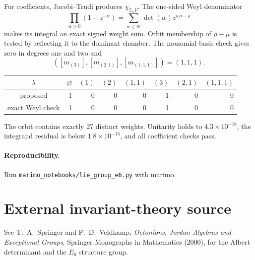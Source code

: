 \documentclass[10pt]{article}
\begin{document}
For coefficients, Jacobi--Trudi produces $\chi_{\mathbb S_\lambda V}$.
The one-sided Weyl denominator
\[
 \prod_{\alpha>0}(1-z^{-\alpha})=
 \sum_{w\in W}\det(w)z^{w\rho-\rho}
\]
makes its integral an exact signed weight sum.  Orbit membership of
$\rho-\mu$ is tested by reflecting it to the dominant chamber.
The monomial-basis check gives zero in degrees one and two and
\[
([m_{(3)}],[m_{(2,1)}],[m_{(1,1,1)}])=(1,1,1).
\]

\begin{center}\small
\begin{tabular}{@{}c|rrrrrrr@{}}\toprule
$\lambda$&$\varnothing$&$(1)$&$(2)$&$(1,1)$&$(3)$&$(2,1)$&$(1,1,1)$\\\midrule
proposed&1&0&0&0&1&0&0\\
exact Weyl check&1&0&0&0&1&0&0\\\bottomrule
\end{tabular}
\end{center}
The orbit contains exactly 27 distinct weights.  Unitarity holds to
$4.3\times10^{-16}$, the integrand residual is below $1.8\times10^{-15}$,
and all coefficient checks pass.

\paragraph{Reproducibility.} Run \texttt{marimo\_notebooks/lie\_group\_e6.py} with marimo.
\section*{External invariant-theory source}
See T.~A.~Springer and F.~D.~Veldkamp, \emph{Octonions, Jordan Algebras and
Exceptional Groups}, Springer Monographs in Mathematics (2000), for the
Albert determinant and the $E_6$ structure group.
\end{document}
